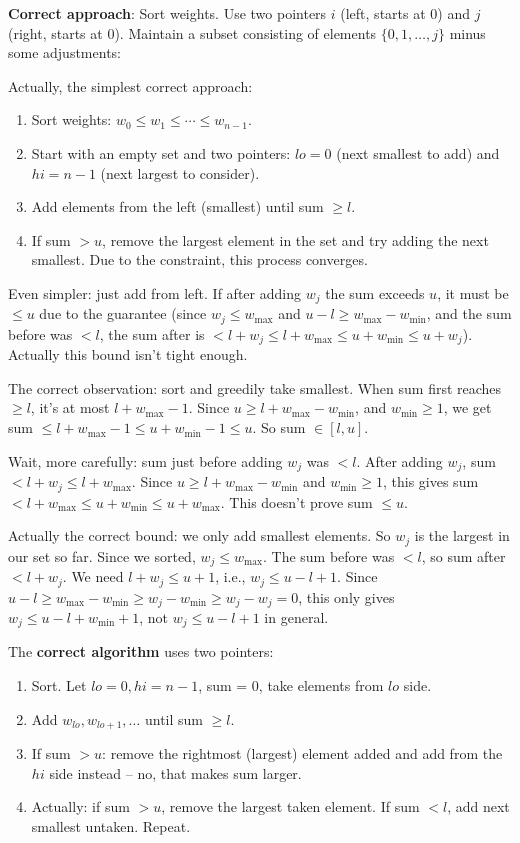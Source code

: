 \documentclass[11pt,a4paper]{article}
\begin{document}
\textbf{Correct approach}: Sort weights. Use two pointers $i$ (left, starts at 0) and $j$ (right, starts at 0). Maintain a subset consisting of elements $\{0, 1, \ldots, j\}$ minus some adjustments:

Actually, the simplest correct approach:
\begin{enumerate}
  \item Sort weights: $w_0 \le w_1 \le \cdots \le w_{n-1}$.
  \item Start with an empty set and two pointers: $lo = 0$ (next smallest to add) and $hi = n-1$ (next largest to consider).
  \item Add elements from the left (smallest) until sum $\ge l$.
  \item If sum $> u$, remove the largest element in the set and try adding the next smallest. Due to the constraint, this process converges.
\end{enumerate}

Even simpler: just add from left. If after adding $w_j$ the sum exceeds $u$, it must be $\le u$ due to the guarantee (since $w_j \le w_{\max}$ and $u - l \ge w_{\max} - w_{\min}$, and the sum before was $< l$, the sum after is $< l + w_j \le l + w_{\max} \le u + w_{\min} \le u + w_j$). Actually this bound isn't tight enough.

The correct observation: sort and greedily take smallest. When sum first reaches $\ge l$, it's at most $l + w_{\max} - 1$. Since $u \ge l + w_{\max} - w_{\min}$, and $w_{\min} \ge 1$, we get sum $\le l + w_{\max} - 1 \le u + w_{\min} - 1 \le u$. So sum $\in [l, u]$.

Wait, more carefully: sum just before adding $w_j$ was $< l$. After adding $w_j$, sum $< l + w_j \le l + w_{\max}$. Since $u \ge l + w_{\max} - w_{\min}$ and $w_{\min} \ge 1$, this gives sum $< l + w_{\max} \le u + w_{\min} \le u + w_{\max}$. This doesn't prove sum $\le u$.

Actually the correct bound: we only add smallest elements. So $w_j$ is the largest in our set so far. Since we sorted, $w_j \le w_{\max}$. The sum before was $< l$, so sum after $< l + w_j$. We need $l + w_j \le u + 1$, i.e., $w_j \le u - l + 1$. Since $u - l \ge w_{\max} - w_{\min} \ge w_j - w_{\min} \ge w_j - w_j = 0$, this only gives $w_j \le u - l + w_{\min} + 1$, not $w_j \le u - l + 1$ in general.

The \textbf{correct algorithm} uses two pointers:

\begin{enumerate}
  \item Sort. Let $lo = 0, hi = n-1$, sum = 0, take elements from $lo$ side.
  \item Add $w_{lo}, w_{lo+1}, \ldots$ until sum $\ge l$.
  \item If sum $> u$: remove the rightmost (largest) element added and add from the $hi$ side instead -- no, that makes sum larger.
  \item Actually: if sum $> u$, remove the largest taken element. If sum $< l$, add next smallest untaken. Repeat.
\end{enumerate}
\end{document}
